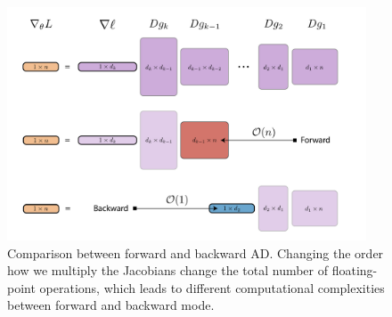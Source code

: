 \begin{figure}
    \centering
    \includegraphics[width=0.95\textwidth]{figures/VJP-JVP.png}
    \caption{Comparison between forward and backward AD. Changing the order how we multiply the Jacobians change the total number of floating-point operations, which leads to different computational complexities between forward and backward mode.}
    \label{fig:vjp-jvp}
\end{figure}
